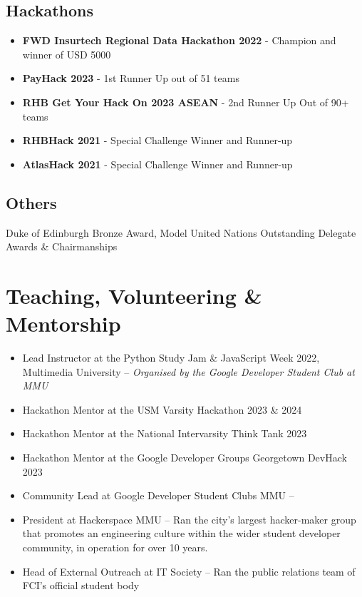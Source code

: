 \documentclass{article}
\begin{document}
\subsection{Hackathons}

\begin{itemize}
    \item \textbf{FWD Insurtech Regional Data Hackathon 2022} - Champion and winner of USD 5000
    \item \textbf{PayHack 2023} - 1st Runner Up out of 51 teams
    \item \textbf{RHB Get Your Hack On 2023 ASEAN} - 2nd Runner Up Out of 90+ teams
    \item \textbf{RHBHack 2021} - Special Challenge Winner and Runner-up
    \item \textbf{AtlasHack 2021} - Special Challenge Winner and Runner-up
\end{itemize}

\subsection{Others}

Duke of Edinburgh Bronze Award, Model United Nations Outstanding Delegate Awards \& Chairmanships

\section{Teaching, Volunteering \& Mentorship}

\begin{itemize}
    \item Lead Instructor at the Python Study Jam \& JavaScript Week 2022, Multimedia University -- \textit{Organised by the Google Developer Student Club at MMU}
    \item Hackathon Mentor at the USM Varsity Hackathon 2023 \& 2024
    \item Hackathon Mentor at the National Intervarsity Think Tank 2023
    \item Hackathon Mentor at the Google Developer Groups Georgetown DevHack 2023
    \item Community Lead at Google Developer Student Clubs MMU -- 
    \item President at Hackerspace MMU -- Ran the city's largest hacker-maker group that promotes an engineering culture within the wider student developer community, in operation for over 10 years.
    \item Head of External Outreach at IT Society -- Ran the public relations team of FCI's official student body

\end{itemize}
\end{document}
